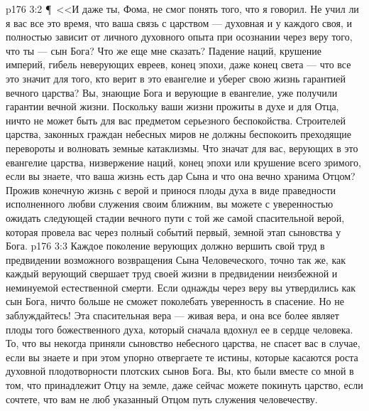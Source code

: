 \vs p176 3:2 \P\ <<И даже ты, Фома, не смог понять того, что я говорил. Не учил ли я вас все это время, что ваша связь с царством --- духовная и у каждого своя, и полностью зависит от личного духовного опыта при осознании через веру того, что ты --- сын Бога? Что же еще мне сказать? Падение наций, крушение империй, гибель неверующих евреев, конец эпохи, даже конец света --- что все это значит для того, кто верит в это евангелие и уберег свою жизнь гарантией вечного царства? Вы, знающие Бога и верующие в евангелие, уже получили гарантии вечной жизни. Поскольку ваши жизни прожиты в духе и для Отца, ничто не может быть для вас предметом серьезного беспокойства. Строителей царства, законных граждан небесных миров не должны беспокоить преходящие перевороты и волновать земные катаклизмы. Что значат для вас, верующих в это евангелие царства, низвержение наций, конец эпохи или крушение всего зримого, если вы знаете, что ваша жизнь есть дар Сына и что она вечно хранима Отцом? Прожив конечную жизнь с верой и принося плоды духа в виде праведности исполненного любви служения своим ближним, вы можете с уверенностью ожидать следующей стадии вечного пути с той же самой спасительной верой, которая провела вас через полный событий первый, земной этап сыновства у Бога.
\vs p176 3:3 Каждое поколение верующих должно вершить свой труд в предвидении возможного возвращения Сына Человеческого, точно так же, как каждый верующий свершает труд своей жизни в предвидении неизбежной и неминуемой естественной смерти. Если однажды через веру вы утвердились как сын Бога, ничто больше не сможет поколебать уверенность в спасение. Но не заблуждайтесь! Эта спасительная вера --- живая вера, и она все более являет плоды того божественного духа, который сначала вдохнул ее в сердце человека. То, что вы некогда приняли сыновство небесного царства, не спасет вас в случае, если вы знаете и при этом упорно отвергаете те истины, которые касаются роста духовной плодотворности плотских сынов Бога. Вы, кто были вместе со мной в том, что принадлежит Отцу на земле, даже сейчас можете покинуть царство, если сочтете, что вам не люб указанный Отцом путь служения человечеству.

